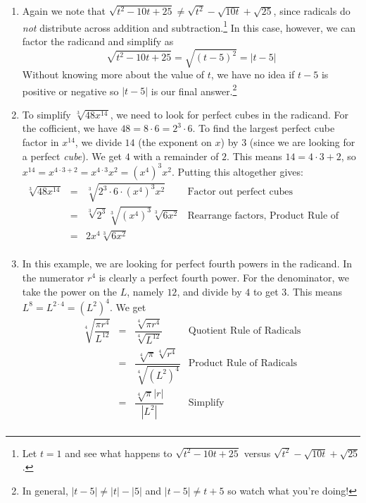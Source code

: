 \documentclass{ximera}
\begin{document}
{\begin{example}
\begin{enumerate}
\item Again we note that $\sqrt{t^2-10t+25}  \neq \sqrt{t^2} - \sqrt{10t} + \sqrt{25}$, since radicals do \textit{not} distribute across addition and subtraction.\footnote{Let $t = 1$ and see what happens to $\sqrt{t^2-10t+25}$  versus $\sqrt{t^2} - \sqrt{10t} + \sqrt{25}$.}  In this case, however, we can factor the radicand and simplify as \[ \sqrt{t^2 - 10t + 25} = \sqrt{(t-5)^2} = |t-5| \]
Without knowing more about the value of $t$, we have no idea if $t-5$ is positive or negative so $|t-5|$ is our final answer.\footnote{In general,  $|t-5| \neq |t| - |5|$ and  $|t-5| \neq t + 5$ so watch what you're doing!}

\item  To simplify $\sqrt[3]{48x^{14}}$, we need to look for perfect cubes in the radicand.  For the cofficient, we have $48 = 8 \cdot 6 = 2^3 \cdot 6$.  To find the largest perfect cube factor in $x^{14}$, we divide $14$ (the exponent on $x$) by $3$ (since we are looking for a perfect \textit{cube}).  We get $4$ with a remainder of $2$.  This means $14 = 4 \cdot 3 + 2$, so $x^{14} = x^{4 \cdot 3 + 2} = x^{4 \cdot 3} x^2 = (x^4)^3 x^2$.  Putting this altogether gives:\[\begin{array}{rclr}

\sqrt[3]{48x^{14}} & = & \sqrt[3]{2^3 \cdot 6 \cdot(x^4)^3 x^2} & \text{Factor out perfect cubes} \\ [2pt]
                   & = & \sqrt[3]{2^3} \sqrt[3]{(x^4)^3} \sqrt[3]{6x^2} & \text{Rearrange factors,  Product Rule of Radicals} \\ [2pt]
									 & = & 2x^4\sqrt[3]{6x^2} & \\
\end{array} \]

\item  In this example, we are looking for perfect fourth powers in the radicand.  In the numerator $r^4$ is clearly a perfect fourth power.  For the denominator, we take the power on the $L$, namely $12$, and divide by $4$ to get $3$.  This means $L^{8} = L^{2\cdot 4} = (L^2)^{4}$.  We get \[ \begin{array}{rclr}

\sqrt[4]{\dfrac{\pi r^{4}}{L^{12}}} & = & \dfrac{\sqrt[4]{\pi r^{4}}}{\sqrt[4]{L^{12}}} & \text{Quotient Rule of Radicals} \\ [12pt]

                                    & = & \dfrac{\sqrt[4]{\pi}\sqrt[4]{r^{4}}}{\sqrt[4]{(L^2)^{4}}} & \text{Product Rule of Radicals} \\ [12pt]
																		& = & \dfrac{\sqrt[4]{\pi}|r|}{|L^2|} & \text{Simplify} \\
																	

\end{array}\]
\end{enumerate}
\end{example}}
\end{document}
